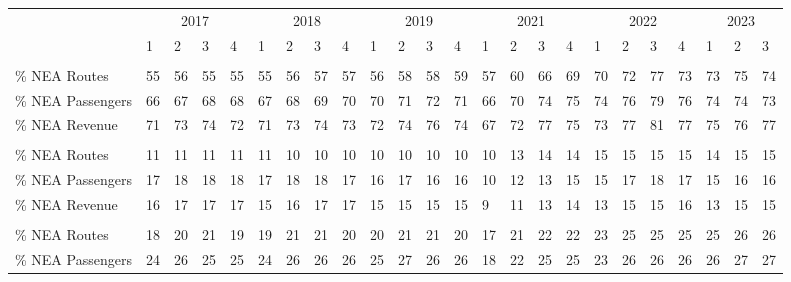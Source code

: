 
\begin{tabular}[t]{llllllllllllllllllllllll}
\toprule
\multicolumn{1}{c}{ } & \multicolumn{4}{c}{2017} & \multicolumn{4}{c}{2018} & \multicolumn{4}{c}{2019} & \multicolumn{4}{c}{2021} & \multicolumn{4}{c}{2022} & \multicolumn{3}{c}{2023} \\
\cmidrule(l{3pt}r{3pt}){2-5} \cmidrule(l{3pt}r{3pt}){6-9} \cmidrule(l{3pt}r{3pt}){10-13} \cmidrule(l{3pt}r{3pt}){14-17} \cmidrule(l{3pt}r{3pt}){18-21} \cmidrule(l{3pt}r{3pt}){22-24}
 & 1 & 2 & 3 & 4 & 1 & 2 & 3 & 4 & 1 & 2 & 3 & 4 & 1 & 2 & 3 & 4 & 1 & 2 & 3 & 4 & 1 & 2 & 3\\
\midrule
\addlinespace[0.3em]
\multicolumn{24}{l}{\textbf{JetBlue}}\\
\hspace{1em}\% NEA Routes & 55 & 56 & 55 & 55 & 55 & 56 & 57 & 57 & 56 & 58 & 58 & 59 & 57 & 60 & 66 & 69 & 70 & 72 & 77 & 73 & 73 & 75 & 74\\
\hspace{1em}\% NEA Passengers & 66 & 67 & 68 & 68 & 67 & 68 & 69 & 70 & 70 & 71 & 72 & 71 & 66 & 70 & 74 & 75 & 74 & 76 & 79 & 76 & 74 & 74 & 73\\
\hspace{1em}\% NEA Revenue & 71 & 73 & 74 & 72 & 71 & 73 & 74 & 73 & 72 & 74 & 76 & 74 & 67 & 72 & 77 & 75 & 73 & 77 & 81 & 77 & 75 & 76 & 77\\
\addlinespace[0.3em]
\multicolumn{24}{l}{\textbf{American}}\\
\hspace{1em}\% NEA Routes & 11 & 11 & 11 & 11 & 11 & 10 & 10 & 10 & 10 & 10 & 10 & 10 & 10 & 13 & 14 & 14 & 15 & 15 & 15 & 15 & 14 & 15 & 15\\
\hspace{1em}\% NEA Passengers & 17 & 18 & 18 & 18 & 17 & 18 & 18 & 17 & 16 & 17 & 16 & 16 & 10 & 12 & 13 & 15 & 15 & 17 & 18 & 17 & 15 & 16 & 16\\
\hspace{1em}\% NEA Revenue & 16 & 17 & 17 & 17 & 15 & 16 & 17 & 17 & 15 & 15 & 15 & 15 & 9 & 11 & 13 & 14 & 13 & 15 & 15 & 16 & 13 & 15 & 15\\
\addlinespace[0.3em]
\multicolumn{24}{l}{\textbf{Delta}}\\
\hspace{1em}\% NEA Routes & 18 & 20 & 21 & 19 & 19 & 21 & 21 & 20 & 20 & 21 & 21 & 20 & 17 & 21 & 22 & 22 & 23 & 25 & 25 & 25 & 25 & 26 & 26\\
\hspace{1em}\% NEA Passengers & 24 & 26 & 25 & 25 & 24 & 26 & 26 & 26 & 25 & 27 & 26 & 26 & 18 & 22 & 25 & 25 & 23 & 26 & 26 & 26 & 26 & 27 & 27\\

\end{tabular}
